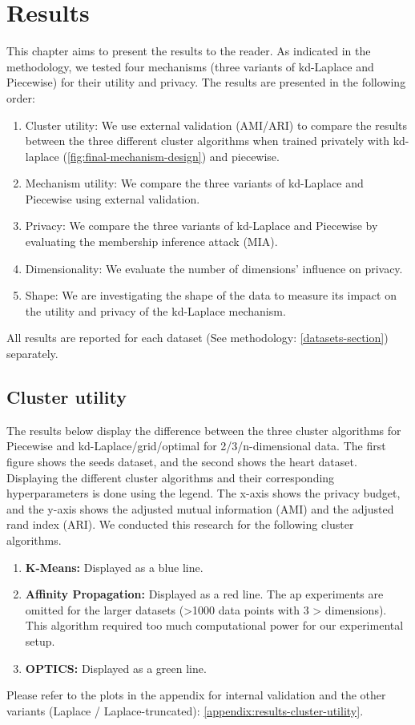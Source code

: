 \chapter{Results}
This chapter aims to present the results to the reader.
As indicated in the methodology, we tested four mechanisms (three variants of kd-Laplace and Piecewise) for their utility and privacy.
The results are presented in the following order:
\begin{enumerate}
    \item Cluster utility: We use external validation (AMI/ARI) to compare the results between the three different cluster algorithms when trained privately with kd-laplace (\ref{fig:final-mechanism-design}) and piecewise.
    \item Mechanism utility: We compare the three variants of kd-Laplace and Piecewise using external validation.
    \item Privacy: We compare the three variants of kd-Laplace and Piecewise by evaluating the membership inference attack (MIA).
    \item Dimensionality: We evaluate the number of dimensions' influence on privacy.
    \item Shape: We are investigating the shape of the data to measure its impact on the utility and privacy of the kd-Laplace mechanism.
\end{enumerate}
All results are reported for each dataset (See methodology: \ref{datasets-section}) separately.
\newpage
\section{Cluster utility}
The results below display the difference between the three cluster algorithms for Piecewise and kd-Laplace/grid/optimal for 2/3/n-dimensional data.
The first figure shows the seeds dataset, and the second shows the heart dataset. \newline
Displaying the different cluster algorithms and their corresponding hyperparameters is done using the legend.
The x-axis shows the privacy budget, and the y-axis shows the adjusted mutual information (AMI) and the adjusted rand index (ARI).
We conducted this research for the following cluster algorithms.
\begin{enumerate}
    \item \textbf{K-Means:} Displayed as a blue line.
    \item \textbf{Affinity Propagation:} Displayed as a red line.
          The \gls{ap} experiments are omitted for the larger datasets (>1000 data points with 3 > dimensions).
          This algorithm required too much computational power for our experimental setup.
    \item \textbf{OPTICS:} Displayed as a green line.
\end{enumerate}
Please refer to the plots in the appendix for internal validation and the other variants (Laplace / Laplace-truncated): \ref{appendix:results-cluster-utility}.

